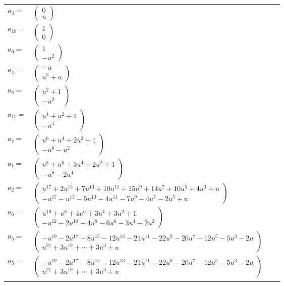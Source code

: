 \documentclass[1p]{elsarticle_modified}
\theoremstyle{definition}
\begin{document}
\begin{tabular}{m{7pt} m{180pt} m{7pt} m{180pt} }
\flushright $a_{3}=$&$\begin{pmatrix}0\\u\end{pmatrix}$ \\
\flushright $a_{10}=$&$\begin{pmatrix}1\\0\end{pmatrix}$ \\
\flushright $a_{9}=$&$\begin{pmatrix}1\\- u^2\end{pmatrix}$ \\
\flushright $a_{4}=$&$\begin{pmatrix}- u\\u^3+u\end{pmatrix}$ \\
\flushright $a_{8}=$&$\begin{pmatrix}u^2+1\\- u^2\end{pmatrix}$ \\
\flushright $a_{11}=$&$\begin{pmatrix}u^4+u^2+1\\- u^4\end{pmatrix}$ \\
\flushright $a_{7}=$&$\begin{pmatrix}u^6+u^4+2 u^2+1\\- u^6- u^2\end{pmatrix}$ \\
\flushright $a_{1}=$&$\begin{pmatrix}u^8+u^6+3 u^4+2 u^2+1\\- u^8-2 u^4\end{pmatrix}$ \\
\flushright $a_{2}=$&$\begin{pmatrix}u^{17}+2 u^{15}+7 u^{13}+10 u^{11}+15 u^9+14 u^7+10 u^5+4 u^3+u\\- u^{17}- u^{15}-5 u^{13}-4 u^{11}-7 u^9-4 u^7-2 u^5+u\end{pmatrix}$ \\
\flushright $a_{6}=$&$\begin{pmatrix}u^{10}+u^8+4 u^6+3 u^4+3 u^2+1\\- u^{12}-2 u^{10}-4 u^8-6 u^6-3 u^4-2 u^2\end{pmatrix}$ \\
\flushright $a_{5}=$&$\begin{pmatrix}- u^{19}-2 u^{17}-8 u^{15}-12 u^{13}-21 u^{11}-22 u^9-20 u^7-12 u^5-5 u^3-2 u\\u^{21}+3 u^{19}+\cdots+3 u^3+u\end{pmatrix}$\\ \flushright $a_{5}=$&$\begin{pmatrix}- u^{19}-2 u^{17}-8 u^{15}-12 u^{13}-21 u^{11}-22 u^9-20 u^7-12 u^5-5 u^3-2 u\\u^{21}+3 u^{19}+\cdots+3 u^3+u\end{pmatrix}$\\&\end{tabular}
\end{document}
